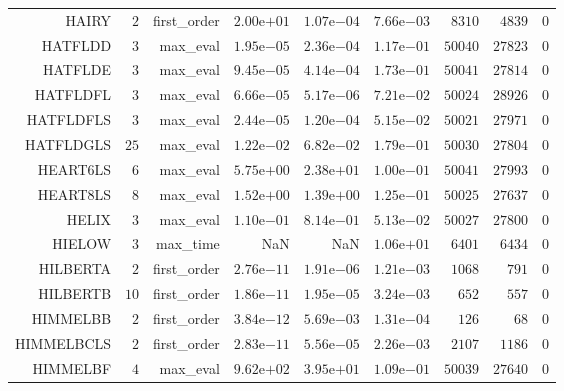 \begin{longtable}{rrrrrrrrr}
HAIRY & \(     2\) & first\_order & \( 2.00\)e\(+01\) & \( 1.07\)e\(-04\) & \( 7.66\)e\(-03\) & \(  8310\) & \(  4839\) & \(     0\) \\
HATFLDD & \(     3\) & max\_eval & \( 1.95\)e\(-05\) & \( 2.36\)e\(-04\) & \( 1.17\)e\(-01\) & \( 50040\) & \( 27823\) & \(     0\) \\
HATFLDE & \(     3\) & max\_eval & \( 9.45\)e\(-05\) & \( 4.14\)e\(-04\) & \( 1.73\)e\(-01\) & \( 50041\) & \( 27814\) & \(     0\) \\
HATFLDFL & \(     3\) & max\_eval & \( 6.66\)e\(-05\) & \( 5.17\)e\(-06\) & \( 7.21\)e\(-02\) & \( 50024\) & \( 28926\) & \(     0\) \\
HATFLDFLS & \(     3\) & max\_eval & \( 2.44\)e\(-05\) & \( 1.20\)e\(-04\) & \( 5.15\)e\(-02\) & \( 50021\) & \( 27971\) & \(     0\) \\
HATFLDGLS & \(    25\) & max\_eval & \( 1.22\)e\(-02\) & \( 6.82\)e\(-02\) & \( 1.79\)e\(-01\) & \( 50030\) & \( 27804\) & \(     0\) \\
HEART6LS & \(     6\) & max\_eval & \( 5.75\)e\(+00\) & \( 2.38\)e\(+01\) & \( 1.00\)e\(-01\) & \( 50041\) & \( 27993\) & \(     0\) \\
HEART8LS & \(     8\) & max\_eval & \( 1.52\)e\(+00\) & \( 1.39\)e\(+00\) & \( 1.25\)e\(-01\) & \( 50025\) & \( 27637\) & \(     0\) \\
HELIX & \(     3\) & max\_eval & \( 1.10\)e\(-01\) & \( 8.14\)e\(-01\) & \( 5.13\)e\(-02\) & \( 50027\) & \( 27800\) & \(     0\) \\
HIELOW & \(     3\) & max\_time &       NaN &       NaN & \( 1.06\)e\(+01\) & \(  6401\) & \(  6434\) & \(     0\) \\
HILBERTA & \(     2\) & first\_order & \( 2.76\)e\(-11\) & \( 1.91\)e\(-06\) & \( 1.21\)e\(-03\) & \(  1068\) & \(   791\) & \(     0\) \\
HILBERTB & \(    10\) & first\_order & \( 1.86\)e\(-11\) & \( 1.95\)e\(-05\) & \( 3.24\)e\(-03\) & \(   652\) & \(   557\) & \(     0\) \\
HIMMELBB & \(     2\) & first\_order & \( 3.84\)e\(-12\) & \( 5.69\)e\(-03\) & \( 1.31\)e\(-04\) & \(   126\) & \(    68\) & \(     0\) \\
HIMMELBCLS & \(     2\) & first\_order & \( 2.83\)e\(-11\) & \( 5.56\)e\(-05\) & \( 2.26\)e\(-03\) & \(  2107\) & \(  1186\) & \(     0\) \\
HIMMELBF & \(     4\) & max\_eval & \( 9.62\)e\(+02\) & \( 3.95\)e\(+01\) & \( 1.09\)e\(-01\) & \( 50039\) & \( 27640\) & \(     0\) \\

\end{longtable}
